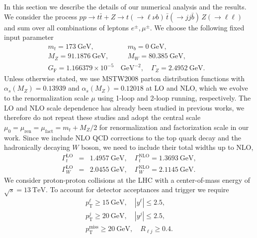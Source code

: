 \documentclass[preprint]{JHEP3} %
\newcommand{\GeV}{\mathrm{GeV}}
\newcommand{\TeV}{\mathrm{TeV}}
\newcommand{\pT}{p_{\mathrm{T}}}
\def\ttb{t\bar{t}}
\newcommand{\be}{\begin{eqnarray}}
\newcommand{\ee}{\end{eqnarray}}
\begin{document}
In this section we describe the details of our numerical analysis and the results.
We consider the process 
$pp \to \ttb + Z \to t(\to \ell \nu b) \, \bar{t} (\to jj \bar{b}) \, Z(\to \ell \ell)$
and sum over all combinations of leptons $e^\pm, \mu^\pm$.
We choose the following fixed input parameter
\be
 m_t = 173~\GeV,& \quad   m_b = 0~\GeV,&
\nonumber\\
 M_Z =91.1876~\GeV,& \quad  M_W =80.385~\GeV,&
\nonumber\\
 G_\mathrm{F} = 1.166379 \times 10^{-5} \,& \GeV^{-2},  \quad \Gamma_Z = 2.4952~\GeV.&
\ee
Unless otherwise stated, we use MSTW2008 parton distribution functions \cite{...} with 
$\alpha_s(M_Z)=0.13939$ and $\alpha_s(M_Z)=0.12018$ at LO and NLO, which we
evolve to the renormalization scale $\mu$ using 1-loop and 2-loop running, respectively.
The LO and NLO scale dependence has already been studied in previous works,
we therefore do not repeat these studies and adopt the central scale \cite{Lazopoulos:2008de}  
$\mu_0=\mu_\mathrm{ren}=\mu_\mathrm{fact}=m_t + M_Z/2$ 
for renormalization and factorization scale in our work.
Since we include NLO QCD corrections to the top quark decay and the hadronically decaying $W$ boson, we need to 
include their total widths up to NLO,
\be
 \Gamma_t^\mathrm{LO} &=& 1.4957~\GeV, \quad \Gamma_t^\mathrm{NLO} = 1.3693~\GeV,
\nonumber\\
 \Gamma_W^\mathrm{LO} &=& 2.0455~\GeV, \quad \Gamma_W^\mathrm{NLO} = 2.1145~\GeV.
\ee
We consider proton-proton collisions at the LHC with a center-of-mass energy of $\sqrt{s}=13~\TeV$.
To account for detector acceptances and trigger we require
\be
 \pT^{\ell} \ge 15~\GeV, \quad |y^{\ell}| \le 2.5,
\nonumber\\
 \pT^{j} \ge 20~\GeV, \quad |y^{j}| \le 2.5,
\nonumber\\
 \pT^{\mathrm{miss}} \ge 20~\GeV, \quad R_{\ell j} \ge 0.4.
\ee
\end{document}
